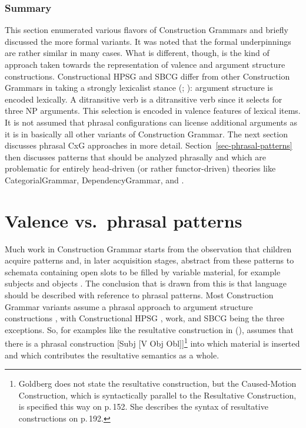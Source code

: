 \documentclass[output=paper,biblatex,babelshorthands,newtxmath,draftmode,colorlinks,citecolor=brown]{langscibook}
\begin{document}

\subsubsection{Summary}

This section enumerated various flavors of Construction Grammars and briefly discussed the more
formal variants. It was noted that the formal underpinnings are rather similar in many cases. What
is different, though, is the kind of approach taken towards the representation of valence and argument
structure constructions. Constructional HPSG and SBCG differ from other Construction Grammars in
taking a strongly lexicalist stance (\citealt[Section~10.4.3]{SW2011a};
): argument structure is
encoded lexically. A ditransitive verb is a ditransitive verb since it selects for three NP
arguments. This selection is encoded in valence features of lexical items. It is not assumed that
phrasal configurations can license additional arguments as it is in basically all other variants of
Construction Grammar. The next section discusses phrasal CxG approaches in more
detail. Section~\ref{sec-phrasal-patterns} then discusses patterns that should be analyzed phrasally
and which are problematic for entirely head-driven (or rather functor-driven) theories like
Categorial\indexcg Grammar, Dependency\indexdg Grammar, and .



\section{Valence vs.\ phrasal patterns}
\label{sec-valence}\label{sec-valence-vs-phrasal-patterns}\label{cxg:sec-valence-vs-phrasal-patterns}

\enlargethispage{3pt}
Much work in Construction Grammar starts from the observation that
children acquire patterns and, in later acquisition stages, abstract from these patterns to schemata
containing open slots to be filled by variable material, for example subjects and objects
\citep{Tomasello2003a}. The conclusion that is drawn from this is that language should be
described with reference to phrasal patterns. Most Construction Grammar variants assume a phrasal
approach to argument structure constructions \citep{Goldberg95a,Goldberg2006a,GJ2004a}, with
Constructional HPSG \citep{Sag97a},  work, and SBCG \citep*{SBK2012a,Sag2012a} being the
three exceptions. So, for examples like the resultative construction in (),
\citet[Chapter~8]{Goldberg95a} assumes that there is a phrasal construction [Subj [V Obj
Obl]]\footnote{
Goldberg does not state the resultative construction, but the Caused-Motion Construction, which is
syntactically parallel to the Resultative Construction, is specified this way on p.\,152. She
describes the syntax of resultative constructions on p.\,192.
} into which
material is inserted and which contributes the resultative semantics as a whole.
\end{document}

